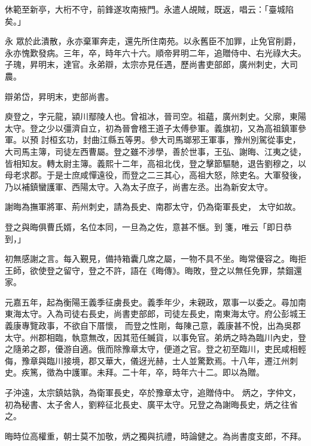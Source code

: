 \begin{pinyinscope}
 休範至新亭，大桁不守，前鋒遂攻南掖門。永遣人覘賊，既返，唱云：「臺城陷矣。」



 永
 眾於此潰散，永亦棄軍奔走，還先所住南苑。以永舊臣不加罪，止免官削爵，永亦愧歎發病。三年，卒，時年六十六。順帝昇明二年，追贈侍中、右光祿大夫。子瑰，昇明末，達官。永弟辯，太宗亦見任遇，歷尚書吏部郎，廣州刺史，大司農。



 辯弟岱，昇明末，吏部尚書。



 庾登之，字元龍，潁川鄢陵人也。曾祖冰，晉司空。祖蘊，廣州刺史。父廓，東陽太守。登之少以彊濟自立，初為晉會稽王道子太傅參軍。義旗初，又為高祖鎮軍參軍。以預
 討桓玄功，封曲江縣五等男。參大司馬瑯邪王軍事，豫州別駕從事史，大司馬主簿，司徒左西曹屬。登之雖不涉學，善於世事，王弘、謝晦、江夷之徒，皆相知友。轉太尉主簿。義熙十二年，高祖北伐，登之擊節驅馳，退告劉穆之，以母老求郡。于是士庶咸憚遠役，而登之二三其心，高祖大怒，除吏名。大軍發後，乃以補鎮蠻護軍、西陽太守。入為太子庶子，尚書左丞。出為新安太守。



 謝晦為撫軍將軍、荊州刺史，請為長史、南郡太守，仍為衛軍長史，
 太守如故。



 登之與晦俱曹氏婿，名位本同，一旦為之佐，意甚不愜。到箋，唯云「即日恭到，」



 初無感謝之言。每入覲見，備持箱囊几席之屬，一物不具不坐。晦常優容之。晦拒王師，欲使登之留守，登之不許，語在《晦傳》。晦敗，登之以無任免罪，禁錮還家。



 元嘉五年，起為衡陽王義季征虜長史。義季年少，未親政，眾事一以委之。尋加南東海太守。入為司徒右長史，尚書吏部郎，司徒左長史，南東海太守。府公彭城王義康專覽政事，不欲自下厝懷，
 而登之性剛，每陳己意，義康甚不悅，出為吳郡太守。州郡相臨，執意無改，因其蒞任贓貨，以事免官。弟炳之時為臨川內史，登之隨弟之郡，優游自適。俄而除豫章太守，便道之官。登之初至臨川，吏民咸相輕侮，豫章與臨川接境，郡又華大，儀迓光赫，士人並驚歎焉。十八年，遷江州刺史。疾篤，徵為中護軍。未拜。二十年，卒，時年六十二。即以為贈。



 子沖遠，太宗鎮姑孰，為衛軍長史，卒於豫章太守，追贈侍中。
 炳之，字仲文，初為秘書、太子舍人，劉粹征北長史、廣平太守。兄登之為謝晦長史，炳之往省之。



 晦時位高權重，朝士莫不加敬，炳之獨與抗禮，時論健之。為尚書度支郎，不拜。




\end{pinyinscope}
